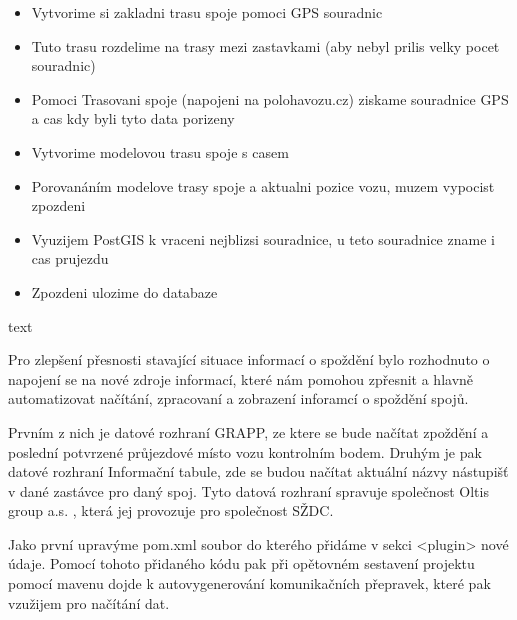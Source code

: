 \begin{itemize}
	\item Vytvorime si zakladni trasu spoje pomoci GPS souradnic
	\item Tuto trasu rozdelime na trasy mezi zastavkami (aby nebyl prilis velky pocet souradnic)
	\item Pomoci Trasovani spoje (napojeni na polohavozu.cz) ziskame souradnice GPS a cas kdy byli tyto data porizeny
	\item Vytvorime modelovou trasu spoje s casem
	\item Porovanáním modelove trasy spoje a aktualni pozice vozu, muzem vypocist zpozdeni
	\item Vyuzijem PostGIS k vraceni nejblizsi souradnice, u teto souradnice zname i cas prujezdu
	\item Zpozdeni ulozime do databaze
\end{itemize}

text


Pro zlepšení přesnosti stavající situace informací o spoždění bylo rozhodnuto o napojení se na nové zdroje informací, které nám pomohou zpřesnit a hlavně automatizovat načítání, zpracovaní a zobrazení inforamcí o spoždění spojů.

 Prvním z nich je datové rozhraní GRAPP, ze ktere se bude načítat zpoždění a poslední potvrzené průjezdové místo vozu kontrolním bodem. Druhým je pak datové rozhraní Informační tabule, zde se budou načítat aktuální názvy nástupišť v dané zastávce pro daný spoj. Tyto datová rozhraní spravuje společnost Oltis group a.s. , která jej provozuje pro společnost SŽDC.
 
 Jako první upravýme pom.xml soubor do kterého přidáme v sekci <plugin> nové údaje. Pomocí tohoto přidaného kódu pak při opětovném sestavení projektu pomocí mavenu dojde k autovygenerování komunikačních přepravek, které pak vzužijem pro načítání dat.
 
 
